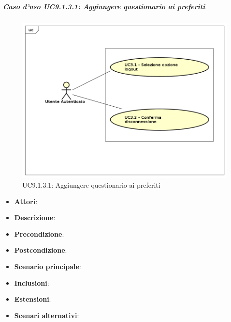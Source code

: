 				\subparagraph{Caso d'uso UC9.1.3.1: Aggiungere questionario ai preferiti}
				\label{UC9.1.3.1}
				\begin{figure}[h]
					\centering
					\includegraphics[scale=0.7,keepaspectratio]{UML/UC9.png}
					\caption{UC9.1.3.1: Aggiungere questionario ai preferiti}
				\end{figure}
				\FloatBarrier
				\begin{itemize}
					\item \textbf{Attori}: 
					\item \textbf{Descrizione}: 
					\item \textbf{Precondizione}: 
					\item \textbf{Postcondizione}: 
					\item \textbf{Scenario principale}:
					\item \textbf{Inclusioni}:
					\item \textbf{Estensioni}:
					\item \textbf{Scenari alternativi}:
				\end{itemize}
				
